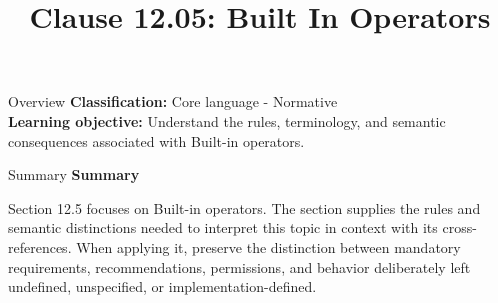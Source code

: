 \documentclass[10pt,letterpaper]{article}
\title{Clause 12.05: Built In Operators}
\author{}
\date{}
\begin{document}
\maketitle
\begin{CornellOverviewBox}{Overview}
\textbf{Classification:} Core language - Normative\\[2pt]
\textbf{Learning objective:} Understand the rules, terminology, and semantic consequences associated with Built-in operators.
\end{CornellOverviewBox}\begin{CornellSummaryBox}{Summary}
{\sffamily\bfseries\color{Accent} Summary}\par\vspace{3pt}Section 12.5 focuses on Built-in operators. The section supplies the rules and semantic distinctions needed to interpret this topic in context with its cross-references. When applying it, preserve the distinction between mandatory requirements, recommendations, permissions, and behavior deliberately left undefined, unspecified, or implementation-defined.
\end{CornellSummaryBox}
\end{document}
